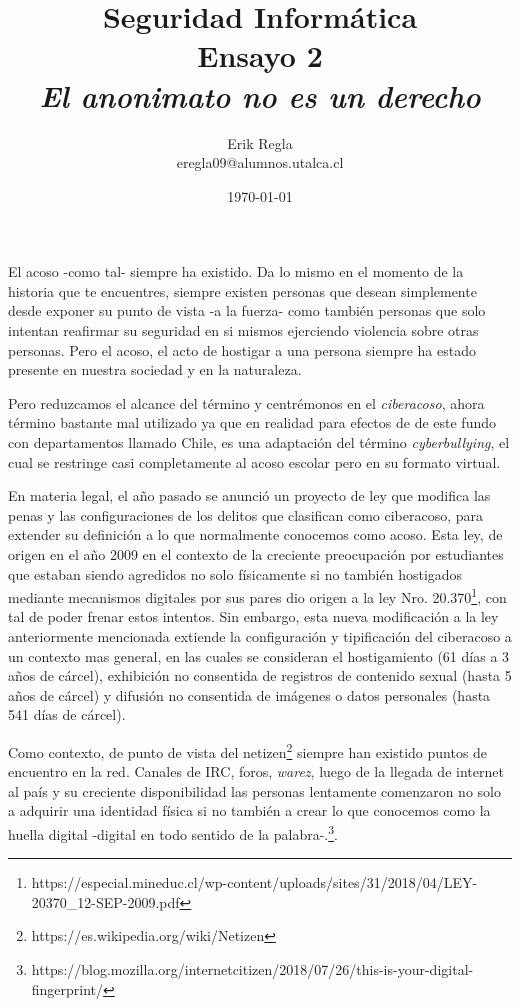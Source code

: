 \documentclass[11pt]{utalcaDoc}
\title{{\bf Seguridad Informática}\\ Ensayo 2 \\\textit{El anonimato no es un derecho}}
\author{Erik Regla\\ eregla09@alumnos.utalca.cl}
\date{\today}
\begin{document}
\maketitle

El acoso -como tal- siempre ha existido. Da lo mismo en el momento de la historia que te encuentres, siempre existen personas que desean simplemente desde exponer su punto de vista -a la fuerza- como también personas que solo intentan reafirmar su seguridad en si mismos ejerciendo violencia sobre otras personas. Pero el acoso, el acto de hostigar a una persona siempre ha estado presente en nuestra sociedad y en la naturaleza.

Pero reduzcamos el alcance del término y centrémonos en el \textit{ciberacoso}, ahora término bastante mal utilizado ya que en realidad para efectos de de este fundo con departamentos llamado Chile, es una adaptación del término \textit{cyberbullying}, el cual se restringe casi completamente al acoso escolar pero en su formato virtual.

En materia legal, el año pasado se anunció un proyecto de ley que modifica las penas y las configuraciones de los delitos que clasifican como ciberacoso, para extender su definición a lo que normalmente conocemos como acoso. Esta ley, de origen en el año 2009 en el contexto de la creciente preocupación por estudiantes que estaban siendo agredidos no solo físicamente si no también hostigados mediante mecanismos digitales por sus pares dio origen a la ley Nro. 20.370\footnote{https://especial.mineduc.cl/wp-content/uploads/sites/31/2018/04/LEY-20370_12-SEP-2009.pdf}, con tal de poder frenar estos intentos. Sin embargo, esta nueva modificación a la ley anteriormente mencionada extiende la configuración y tipificación del ciberacoso a un contexto mas general, en las cuales se consideran el hostigamiento (61 días a 3 años de cárcel), exhibición no consentida de registros de contenido sexual (hasta 5 años de cárcel) y difusión no consentida de imágenes o datos personales (hasta 541 días de cárcel).

Como contexto, de punto de vista del netizen\footnote{https://es.wikipedia.org/wiki/Netizen} siempre han existido puntos de encuentro en la red. Canales de IRC, foros, \textit{warez}, luego de la llegada de internet al país y su creciente disponibilidad las personas lentamente comenzaron no solo a adquirir una identidad física si no también a crear lo que conocemos como la huella digital -digital en todo sentido de la palabra-.\footnote{https://blog.mozilla.org/internetcitizen/2018/07/26/this-is-your-digital-fingerprint/}.
\end{document}
